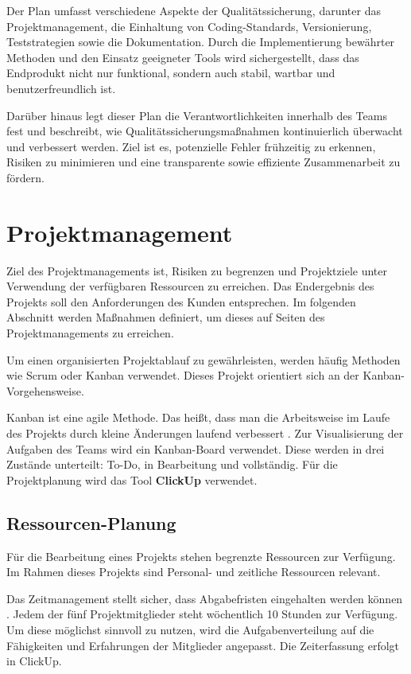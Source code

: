 \documentclass[a4paper,12pt]{article}
\begin{document}
Der Plan umfasst verschiedene Aspekte der Qualitätssicherung, darunter das Projektmanagement, die Einhaltung von Coding-Standards, Versionierung, Teststrategien sowie die Dokumentation. Durch die Implementierung bewährter Methoden und den Einsatz geeigneter Tools wird sichergestellt, dass das Endprodukt nicht nur funktional, sondern auch stabil, wartbar und benutzerfreundlich ist.

Darüber hinaus legt dieser Plan die Verantwortlichkeiten innerhalb des Teams fest und beschreibt, wie Qualitätssicherungsmaßnahmen kontinuierlich überwacht und verbessert werden. Ziel ist es, potenzielle Fehler frühzeitig zu erkennen, Risiken zu minimieren und eine transparente sowie effiziente Zusammenarbeit zu fördern.

\newpage
\section{Projektmanagement}
Ziel des Projektmanagements ist, Risiken zu begrenzen und Projektziele unter Verwendung der verfügbaren Ressourcen zu erreichen. Das Endergebnis des Projekts soll den Anforderungen des Kunden entsprechen. Im folgenden Abschnitt werden Maßnahmen definiert, um dieses auf Seiten des Projektmanagements zu erreichen.

Um einen organisierten Projektablauf zu gewährleisten, werden häufig Methoden wie Scrum oder Kanban verwendet. Dieses Projekt orientiert sich an der Kanban-Vorgehensweise.

Kanban ist eine agile Methode. Das heißt, dass man die Arbeitsweise im Laufe des Projekts durch kleine Änderungen laufend verbessert \cite{dechange_agiles_2024}. Zur Visualisierung der Aufgaben des Teams wird ein Kanban-Board verwendet. Diese werden in drei Zustände unterteilt: To-Do, in Bearbeitung und vollständig. Für die Projektplanung wird das Tool \textbf{ClickUp} verwendet.

\subsection{Ressourcen-Planung} Für die Bearbeitung eines Projekts stehen begrenzte Ressourcen zur Verfügung. Im Rahmen dieses Projekts sind Personal- und zeitliche Ressourcen relevant.

Das Zeitmanagement stellt sicher, dass Abgabefristen eingehalten werden können \cite{helmold_projektmanagement_2023}. Jedem der fünf Projektmitglieder steht wöchentlich 10 Stunden zur Verfügung. Um diese möglichst sinnvoll zu nutzen, wird die Aufgabenverteilung auf die Fähigkeiten und Erfahrungen der Mitglieder angepasst. Die Zeiterfassung erfolgt in ClickUp.
\end{document}
